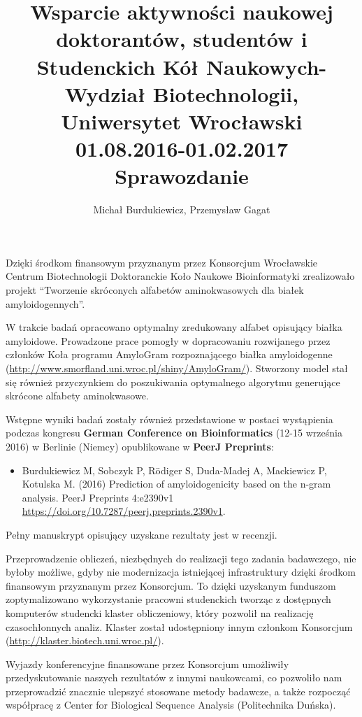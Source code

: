 \documentclass[12pt]{article}
\author{Michał Burdukiewicz, Przemysław Gagat}
\title{\large Wsparcie aktywności naukowej doktorantów, studentów i Studenckich 
  Kół Naukowych- Wydział Biotechnologii, Uniwersytet Wrocławski 
  \\ 
  01.08.2016-01.02.2017 \\ 
  \normalsize Sprawozdanie}
\date{}
\begin{document}
\maketitle

Dzięki środkom finansowym przyznanym przez Konsorcjum Wrocławskie Centrum 
Biotechnologii Doktoranckie Koło Naukowe Bioinformatyki  
zrealizowało projekt ``Tworzenie skróconych alfabetów aminokwasowych dla białek amyloidogennych''.

W trakcie badań opracowano optymalny zredukowany alfabet opisujący białka amyloidowe. 
Prowadzone prace pomogły w dopracowaniu rozwijanego przez członków Koła programu AmyloGram 
rozpoznającego białka amyloidogenne (\url{http://www.smorfland.uni.wroc.pl/shiny/AmyloGram/}).
Stworzony model stał się również przyczynkiem do poszukiwania optymalnego algorytmu generujące 
skrócone alfabety aminokwasowe.

Wstępne wyniki badań zostały również przedstawione w postaci wystąpienia podczas 
kongresu \textbf{German Conference on Bioinformatics} (12-15 września 2016) w 
Berlinie (Niemcy) opublikowane w \textbf{PeerJ Preprints}:
\begin{itemize}
\item Burdukiewicz M, Sobczyk P, Rödiger S, Duda-Madej A, Mackiewicz P, Kotulska M. (2016) Prediction of amyloidogenicity based on the n-gram analysis. PeerJ Preprints 4:e2390v1 \url{https://doi.org/10.7287/peerj.preprints.2390v1}.
\end{itemize}

Pełny manuskrypt opisujący uzyskane rezultaty jest w recenzji.

Przeprowadzenie 
obliczeń, niezbędnych do realizacji tego zadania badawczego, nie byłoby 
możliwe, gdyby nie modernizacja istniejącej infrastruktury dzięki środkom 
finansowym przyznanym przez Konsorcjum. To dzięki uzyskanym funduszom zoptymalizowano wykorzystanie pracowni studenckich tworząc z dostępnych komputerów studencki klaster 
obliczeniowy, który pozwolił na realizację czasochłonnych analiz. Klaster 
został udostępniony innym członkom Konsorcjum (\url{http://klaster.biotech.uni.wroc.pl/}). 

Wyjazdy konferencyjne finansowane przez Konsorcjum umożliwiły przedyskutowanie naszych 
rezultatów z innymi naukowcami, co pozwoliło nam przeprowadzić znacznie ulepszyć stosowane metody 
badawcze, a także rozpocząć współpracę z Center for Biological Sequence Analysis (Politechnika Duńska).
\end{document}
